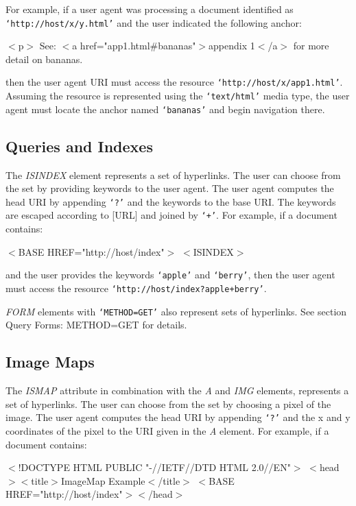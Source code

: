 \par \par 
For example, if a user agent was processing a document identified as
{\tt `http://host/x/y.html'} and the user indicated the following
anchor:
\par $<$p$>$ See: $<$a href="app1.html\#bananas"$>$appendix 1$<$/a$>$ 
for more detail on bananas.
\par 
then the user agent URI must access the resource
{\tt `http://host/x/app1.html'}.  Assuming the resource is represented
using the {\tt `text/html'} media type, the user agent must locate
the anchor named {\tt `bananas'} and begin navigation there.
\par \subsection*{Queries and Indexes}\par 
The {\it ISINDEX} element represents a set of hyperlinks.  The user
can choose from the set by providing keywords to the user agent.  The
user agent computes the head URI by appending {\tt `?'} and the
keywords to the base URI.  The keywords are escaped according to [URL]
and joined by {\tt `+'}.  For example, if a document contains:
\par $<$BASE HREF="http://host/index"$>$
$<$ISINDEX$>$
\par 
and the user provides the keywords {\tt `apple'} and {\tt `berry'},
then the user agent must access the resource
{\tt `http://host/index?apple+berry'}.
\par \par {\it FORM} elements with {\tt `METHOD=GET'} also represent sets of
hyperlinks.  See section Query Forms:  METHOD=GET for details.
\par \subsection*{Image Maps}\par 
The {\it ISMAP} attribute in combination with the {\it A} and
{\it IMG} elements, represents a set of hyperlinks.  The user can
choose from the set by choosing a pixel of the image.  The user agent
computes the head URI by appending {\tt `?'} and the x and y
coordinates of the pixel to the URI given in the {\it A} element.  For
example, if a document contains:
\par $<$!DOCTYPE HTML PUBLIC "-//IETF//DTD HTML 2.0//EN"$>$
$<$head$>$$<$title$>$ImageMap Example$<$/title$>$
$<$BASE HREF="http://host/index"$>$$<$/head$>$

